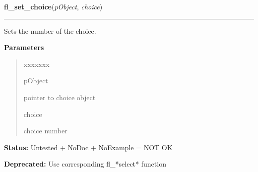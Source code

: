 \hspace{.8\funcindent}\begin{boxedminipage}{\funcwidth}

    \raggedright \textbf{fl\_set\_choice}(\textit{pObject}, \textit{choice})

    \vspace{-1.5ex}

    \rule{\textwidth}{0.5\fboxrule}
\setlength{\parskip}{2ex}
    Sets the number of the choice.

\setlength{\parskip}{1ex}
      \textbf{Parameters}
      \vspace{-1ex}

      \begin{quote}
        \begin{Ventry}{xxxxxxx}

          \item[pObject]

          pointer to choice object

          \item[choice]

          choice number

        \end{Ventry}

      \end{quote}

\textbf{Status:} Untested + NoDoc + NoExample = NOT OK



\textbf{Deprecated:} Use corresponding fl\_*select* function



    \end{boxedminipage}

    \label{xformslib:library:fl_set_choice_text}

    \vspace{0.5ex}

